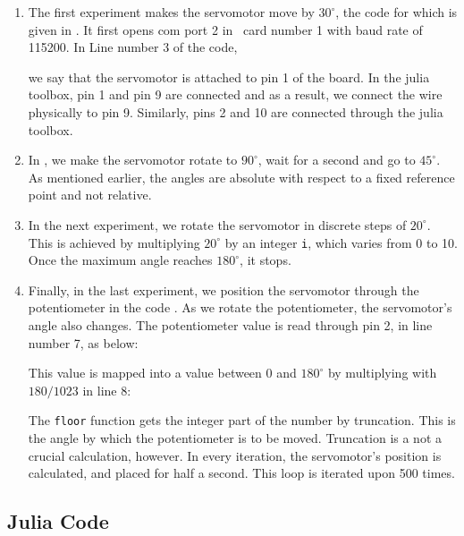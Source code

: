 \begin{enumerate}
  \item The first experiment makes the servomotor move by $30^\circ$,
        the code for which is given in .
        It first opens com port 2 in \arduino\ card number 1 with baud rate
        of 115200.  In Line number 3 of the code, \ie\
        
        we say that the servomotor is attached to pin 1 of the board.
        In the julia toolbox, pin 1 and pin
        9 are connected and as a result, we connect the wire physically to
        pin 9.  Similarly, pins 2 and 10 are connected through the
        julia toolbox.
        
  \item In , we make the servomotor rotate
        to $90^\circ$, wait for a second and go to $45^\circ$.  As mentioned
        earlier, the angles are absolute with respect to a fixed reference
        point and not relative.  
        
  \item In the next experiment, we rotate the servomotor in discrete
        steps of $20^\circ$.  This is achieved by multiplying $20^\circ$ by
        an integer {\tt i}, which varies from 0 to 10.  Once the maximum
        angle reaches $180^\circ$, it stops.  
        
  \item Finally, in the last experiment, we position the servomotor
        through the potentiometer in the code .  As we
        rotate the potentiometer, the servomotor's angle also changes.  The
        potentiometer value is read through pin 2, in line number 7, as
        below:
        
        This value is mapped into a value between 0 and $180^\circ$ by
        multiplying with $180/1023$ in line 8:
        
        The {\tt floor} function gets the integer part of the number by
        truncation.  This is the angle by which the potentiometer is to be
        moved.  Truncation is a not a crucial calculation, however.  In
        every iteration, the servomotor's position is calculated, and placed
        for half a second.  This loop is iterated upon 500 times.
\end{enumerate}

\subsection{Julia Code}
\lstset{style=mystyle}
\label{sec:servo-julia-code}

